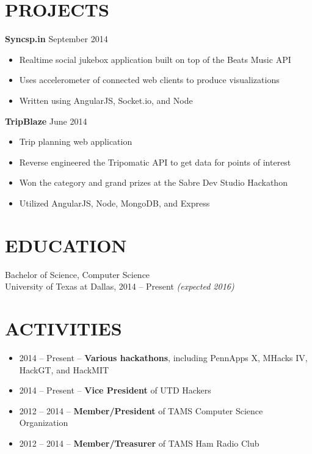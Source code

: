 \documentclass[margin, 10pt]{res} %
\begin{document}
\begin{resume}
  \section{PROJECTS}

  \textbf{Syncsp.in} \hfill September 2014

  \begin{itemize} \itemsep -2pt
    \item Realtime social jukebox application built on top of the Beats Music API
    \item Uses accelerometer of connected web clients to produce visualizations
    \item Written using AngularJS, Socket.io, and Node
  \end{itemize}

  \textbf{TripBlaze} \hfill June 2014

  \begin{itemize} \itemsep -2pt
    \item Trip planning web application
    \item Reverse engineered the Tripomatic API to get data for points of interest
    \item Won the category and grand prizes at the Sabre Dev Studio Hackathon
    \item Utilized AngularJS, Node, MongoDB, and Express
  \end{itemize}

  \section{EDUCATION}

  Bachelor of Science, Computer Science \\
  University of Texas at Dallas, 2014 -- Present \textit {(expected 2016)} \\

  \section{ACTIVITIES} 

  \begin{itemize} \itemsep -2pt
    \item 2014 -- Present -- \textbf{Various hackathons}, including PennApps X, MHacks IV, HackGT, and HackMIT
    \item 2014 -- Present -- \textbf{Vice President} of UTD Hackers
    \item 2012 -- 2014 -- \textbf{Member/President} of TAMS Computer Science Organization
    \item 2012 -- 2014 -- \textbf{Member/Treasurer} of TAMS Ham Radio Club
  \end{itemize}

\end{resume}
\end{document}
